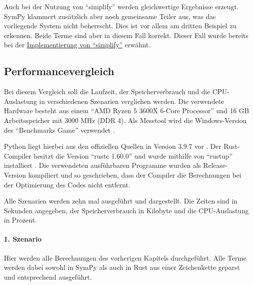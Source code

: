 \documentclass[11pt,a4paper, ngerman]{article}
\begin{document}
Auch bei der Nutzung von ``simplify'' werden gleichwertige Ergebnisse erzeugt. SymPy klammert zusätzlich aber noch gemeinsame Teiler aus, was das vorliegende System nicht beherrscht. Dies ist vor allem am dritten Beispiel zu erkennen. Beide Terme sind aber in diesem Fall korrekt. Dieser Fall wurde bereits bei der \hyperref[sec:Regel2Simp]{Implementierung von ``simplify''} erwähnt.

\subsection{Performancevergleich}
Bei diesem Vergleich soll die Laufzeit, der Speicherverbrauch und die CPU-Auslastung in verschiedenen Szenarien verglichen werden. Die verwendete Hardware besteht aus einem ``AMD Ryzen 5 3600X 6-Core Processor'' und 16 GB Arbeitsspeicher mit 3000 MHz (DDR 4). Als Messtool wird die Windows-Version des ``Benchmarks Game'' verwendet \cite{BenchmarkGameHome} \cite {BenchmarkGameSrc}.

Python liegt hierbei aus den offiziellen Quellen in Version 3.9.7 vor \cite{PythonDownload}. Der Rust-Compiler besitzt die Version ``rustc 1.60.0'' und wurde mithilfe von ``rustup'' installiert \cite{RustDownload}. Die verwendeten ausführbaren Programme wurden als Release-Version kompiliert und so geschrieben, dass der Compiler die Berechnungen bei der Optimierung des Codes nicht entfernt.

Alle Szenarien werden zehn mal ausgeführt und dargestellt. Die Zeiten sind in Sekunden angegeben, der Speicherverbrauch in Kilobyte und die CPU-Auslastung in Prozent.

\paragraph{1. Szenario} Hier werden alle Berechnungen des vorherigen Kapitels durchgeführt. Alle Terme werden dabei sowohl in SymPy als auch in Rust aus einer Zeichenkette geparst und entsprechend ausgeführt.
\end{document}
